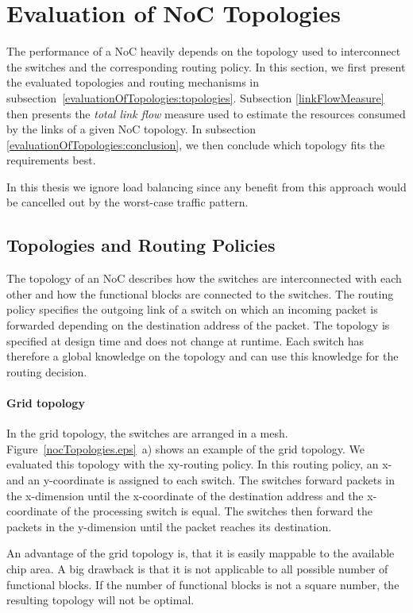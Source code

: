 \section{\label{evaluationOfTopologies}Evaluation of NoC Topologies}
The performance of a NoC heavily depends on the topology used to interconnect the switches and the corresponding routing policy. In this section, we first present the evaluated topologies and routing mechanisms in subsection~\ref{evaluationOfTopologies:topologies}. Subsection \ref{linkFlowMeasure} then presents the \textit{total link flow} measure used to estimate the resources consumed by the links of a given NoC topology. In subsection \ref{evaluationOfTopologies:conclusion}, we then conclude which topology fits the requirements best.

In this thesis we ignore load balancing since any benefit from this approach would be cancelled out by the worst-case traffic pattern.

\subsection{\label{evaluationOfTopologies:topologies}Topologies and Routing Policies}
The topology of an NoC describes how the switches are interconnected with each other and how the functional blocks are connected to the switches. The routing policy specifies the outgoing link of a switch on which an incoming packet is forwarded depending on the destination address of the packet. The topology is specified at design time and does not change at runtime. Each switch has therefore a global knowledge on the topology and can use this knowledge for the routing decision.

\paragraph{Grid topology}
In the grid topology, the switches are arranged in a mesh. Figure~\ref{nocTopologies.eps}~a) shows an example of the grid topology. We evaluated this topology with the xy-routing policy. In this routing policy, an x- and an y-coordinate is assigned to each switch. The switches forward packets in the x-dimension until the x-coordinate of the destination address and the x-coordinate of the processing switch is equal. The switches then forward the packets in the y-dimension until the packet reaches its destination.

An advantage of the grid topology is, that it is easily mappable to the available chip area. A big drawback is that it is not applicable to all possible number of functional blocks. If the number of functional blocks is not a square number, the resulting topology will not be optimal.

